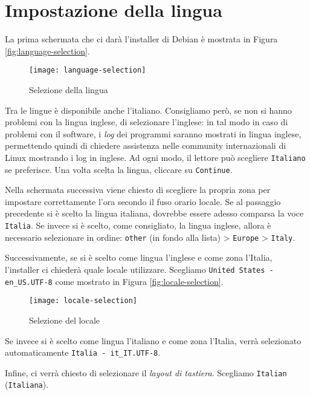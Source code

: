 \section{Impostazione della lingua}
La prima schermata che ci darà l'installer di Debian è mostrata in Figura \vref{fig:language-selection}.

\begin{figure}[ht]
	\centering
	\texttt{[image: language-selection]}
	\caption{Selezione della lingua}
	\label{fig:language-selection}
\end{figure}

Tra le lingue è disponibile anche l'italiano. Consigliamo però, se non si hanno problemi con la lingua inglese, di selezionare l'inglese: in tal modo in caso di problemi con il software, i \textit{log} dei programmi saranno mostrati in lingua inglese, permettendo quindi di chiedere assistenza nelle community internazionali di Linux mostrando i log in inglese. Ad ogni modo, il lettore può scegliere \texttt{Italiano} se preferisce. Una volta scelta la lingua, cliccare su \texttt{Continue}.

Nella schermata successiva viene chiesto di scegliere la propria zona per impostare correttamente l'ora secondo il fuso orario locale. Se al passaggio precedente si è scelto la lingua italiana, dovrebbe essere adesso comparsa la voce \texttt{Italia}. Se invece si è scelto, come consigliato, la lingua inglese, allora è necessario selezionare in ordine: \texttt{other} (in fondo alla lista) > \texttt{Europe} > \texttt{Italy}.

Successivamente, se si è scelto come lingua l'inglese e come zona l'Italia, l'installer ci chiederà quale locale utilizzare. Scegliamo \texttt{United States - en\_US.UTF-8} come mostrato in Figura \vref{fig:locale-selection}.

\begin{figure}[ht]
	\centering
	\texttt{[image: locale-selection]}
	\caption{Selezione del locale}
	\label{fig:locale-selection}
\end{figure}

Se invece si è scelto come lingua l'italiano e come zona l'Italia, verrà selezionato automaticamente \texttt{Italia - it\_IT.UTF-8}.

Infine, ci verrà chiesto di selezionare il \textit{layout di tastiera}. Scegliamo \texttt{Italian} (\texttt{Italiana}).
